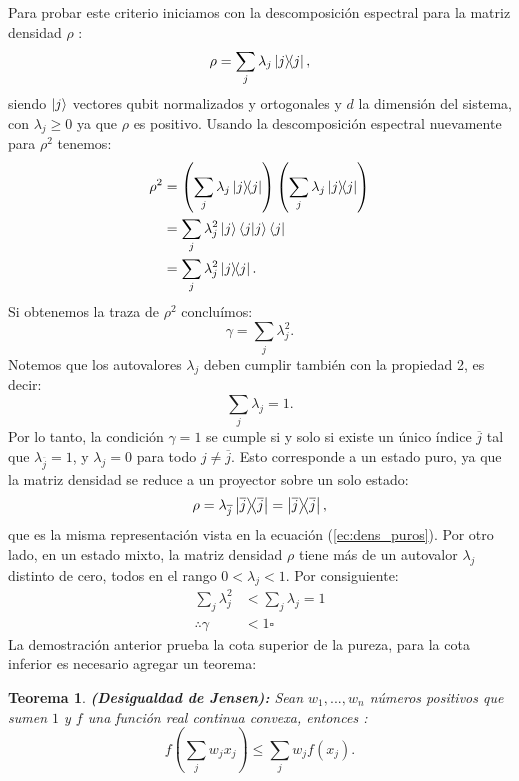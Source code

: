 \documentclass[letterpaper,12pt]{thesisECFM}
\theoremstyle{plain}
\newtheorem{thm}{Teorema}[section]
\theoremstyle{definition}
\theoremstyle{definition}
\theoremstyle{remark}
\newcommand{\1}{\mathbb{1}}
\begin{document}
Para probar este criterio iniciamos con la descomposición espectral
\cite{princip_quantum} para la matriz densidad $\rho$ :
    \begin{equation} 
        \label{ec:dens_espectral}
        \rho = \sum_{j} \lambda_j \ketbra{j},
    \end{equation}
siendo $\ket{j}$ vectores  qubit normalizados y ortogonales y $d$ la dimensión del sistema, con  $\lambda_j \geq0$ ya que $\rho$ es positivo. 
 Usando la descomposición espectral nuevamente para $\rho^2$ tenemos:
    \begin{align}
        \rho^2 & = \left( \sum_{j} \lambda_j \ketbra{j} \right) \left( \sum_{j} \lambda_j \ketbra{j} \right) \\
        &= \sum_{j} \lambda^2_j \ket{j}\braket{j}\bra{j} \\
        & = \sum_{j} \lambda_j^2\ketbra{j}.
    \end{align}
Si obtenemos la traza de $\rho^2$ concluímos: 
    \begin{equation}
    \label{eq:pureza_lambdas}
    \gamma=\sum_j\lambda_j^2.
    \end{equation} 
Notemos que los autovalores $\lambda_j$ deben cumplir también con la propiedad 2, es decir:
    \begin{equation}
    \label{ec:dens_eigvals}
    \sum_j \lambda_j = 1.
    \end{equation} 
Por lo tanto, la condición $\gamma = 1$ se cumple si y solo si existe un único
índice $\overline{j}$ tal que $\lambda_{\overline{j}} = 1$, y $\lambda_j = 0$
para todo $j \ne \overline{j}$.  Esto corresponde a un estado puro, ya que la matriz densidad se
reduce a un proyector sobre un solo estado:
\begin{equation}
\rho  = \lambda_{\overline{j}} \ketbra{\overline{j}} = \ketbra{\overline{j}},
\end{equation}
que es la misma representación vista en la ecuación (\ref{ec:dens_puros}). Por
otro lado, en un estado mixto, la matriz densidad $\rho$ tiene más de un
autovalor $\lambda_j$ distinto de cero, todos en el rango $0 < \lambda_j < 1$.
Por consiguiente:
    \begin{align}
        \sum_j \lambda_j^2 & < \sum_j \lambda_j =1 \\
        \therefore \gamma & < 1 \square
     \end{align}
La demostración anterior prueba la cota superior de la pureza, para la cota
inferior es necesario agregar un teorema:
\begin{thm}
\textbf{(Desigualdad de Jensen):} \label{thm:jensen}  Sean $w_1,...,w_n$
números positivos que sumen $1$ y $f$ una función real continua convexa,
entonces \cite{jensen_wolfram}:
\begin{equation}
    f \left( \sum_j w_j x_j  \right) \leq \sum_j w_j f(x_j).
\end{equation}
\end{thm}
\end{document}
